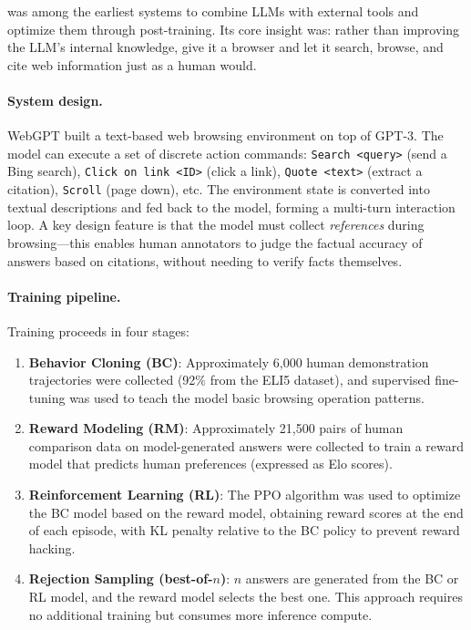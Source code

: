  was among the earliest systems to combine LLMs with external tools and optimize them through post-training. Its core insight was: rather than improving the LLM's internal knowledge, give it a browser and let it search, browse, and cite web information just as a human would.

\paragraph{System design.} WebGPT built a text-based web browsing environment on top of GPT-3. The model can execute a set of discrete action commands: \texttt{Search <query>} (send a Bing search), \texttt{Click on link <ID>} (click a link), \texttt{Quote <text>} (extract a citation), \texttt{Scroll} (page down), etc. The environment state is converted into textual descriptions and fed back to the model, forming a multi-turn interaction loop. A key design feature is that the model must collect \emph{references} during browsing---this enables human annotators to judge the factual accuracy of answers based on citations, without needing to verify facts themselves.

\paragraph{Training pipeline.} Training proceeds in four stages:
\begin{enumerate}[leftmargin=*]
  \item \textbf{Behavior Cloning (BC)}: Approximately 6,000 human demonstration trajectories were collected (92\% from the ELI5 dataset), and supervised fine-tuning was used to teach the model basic browsing operation patterns.
  \item \textbf{Reward Modeling (RM)}: Approximately 21,500 pairs of human comparison data on model-generated answers were collected to train a reward model that predicts human preferences (expressed as Elo scores).
  \item \textbf{Reinforcement Learning (RL)}: The PPO algorithm was used to optimize the BC model based on the reward model, obtaining reward scores at the end of each episode, with KL penalty relative to the BC policy to prevent reward hacking.
  \item \textbf{Rejection Sampling (best-of-$n$)}: $n$ answers are generated from the BC or RL model, and the reward model selects the best one. This approach requires no additional training but consumes more inference compute.
\end{enumerate}

